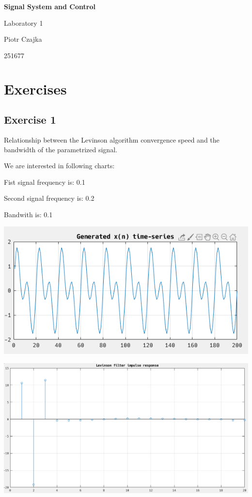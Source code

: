 \documentclass[12pt]{article}
\begin{document}
\textbf{\huge{Signal System and Control}}

\begin{center}
\large{Laboratory 1}
\end{center}

\begin{flushright}
Piotr Czajka

251677
\end{flushright}

\section{Exercises}

\subsection{Exercise 1}

Relationship between the Levinson algorithm convergence speed and the bandwidth of the parametrized signal.

\vspace{1cm}

We are interested in following charts:

Fist signal frequency is: 0.1

Second signal frequency is: 0.2

Bandwith is: 0.1

\includegraphics[width=\textwidth]{1.png}

\includegraphics[width=\textwidth]{2.png}
\end{document}
